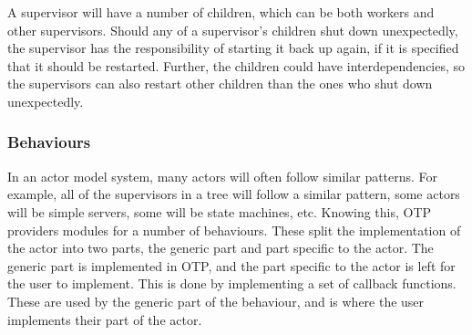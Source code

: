 \documentclass[a4paper]{article}
\begin{document}
\noindent
A supervisor will have a number of children, which can be both workers and other
supervisors. Should any of a supervisor's children shut down unexpectedly, the
supervisor has the responsibility of starting it back up again, if it is
specified that it should be restarted. Further, the children could have
interdependencies, so the supervisors can also restart other children than the ones
who shut down unexpectedly.

\subsubsection{Behaviours}
In an actor model system, many actors will often follow similar patterns. For
example, all of the supervisors in a tree will follow a similar pattern, some
actors will be simple servers, some will be state machines, etc. Knowing this,
OTP providers modules for a number of behaviours. These split the implementation
of the actor into two parts, the generic part and part specific to the actor. The
generic part is implemented in OTP, and the part specific to the actor is left
for the user to implement. This is done by implementing a set of callback
functions. These are used by the generic part of the behaviour, and is where the
user implements their part of the actor.
\end{document}
